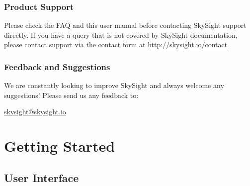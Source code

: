 \documentclass[11pt,a4paper]{article}
\begin{document}
\subsubsection{Product Support}
Please check the FAQ and this user manual before contacting SkySight support directly. If you have a query that is not covered by SkySight documentation, please contact support via the contact form at \url{http://skysight.io/contact}
\subsubsection{Feedback and Suggestions}
We are constantly looking to improve SkySight and always welcome any suggestions! Please send us any feedback to: 
\begin{flushleft}
\url{skysight@skysight.io}
\end{flushleft}
\section{Getting Started}
\subsection{User Interface}
\end{document}
